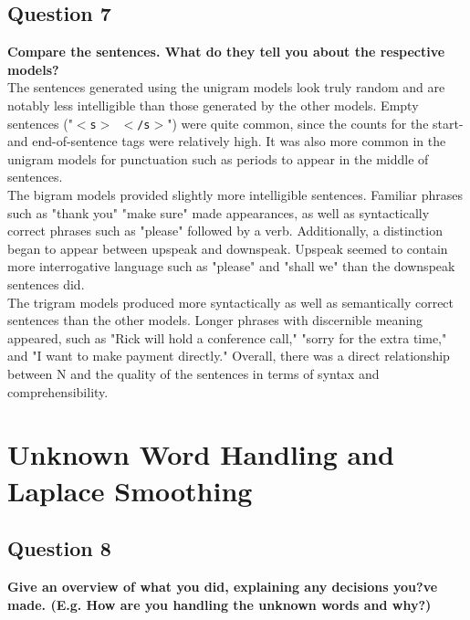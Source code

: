 \documentclass{article} %
\begin{document}

\lipsum[2] %

\subsection*{Question 7}

\textbf{Compare the sentences. What do they tell you about the respective models?}
\\

The sentences generated using the unigram models look truly random and are notably less intelligible than those generated by the other models. Empty sentences ("\texttt{$<$s$>$ $<$/s$>$}") were quite common, since the counts for the start- and end-of-sentence tags were relatively high. It was also more common in the unigram models for punctuation such as periods to appear in the middle of sentences.\\

The bigram models provided slightly more intelligible sentences. Familiar phrases such as "thank you" "make sure" made appearances, as well as syntactically correct phrases such as "please" followed by a verb. Additionally, a distinction began to appear between upspeak and downspeak. Upspeak seemed to contain more interrogative language such as "please" and "shall we" than the downspeak sentences did.\\

The trigram models produced more syntactically as well as semantically correct sentences than the other models. Longer phrases with discernible meaning appeared, such as "Rick will hold a conference call," "sorry for the extra time," and "I want to make payment directly." Overall, there was a direct relationship between N and the quality of the sentences in terms of syntax and comprehensibility.

\lipsum[2] %

\section{Unknown Word Handling and Laplace Smoothing}

\subsection*{Question 8}

\textbf{Give an overview of what you did, explaining any decisions you?ve made. (E.g. How are you handling the unknown words and why?)}
\\
\end{document}
